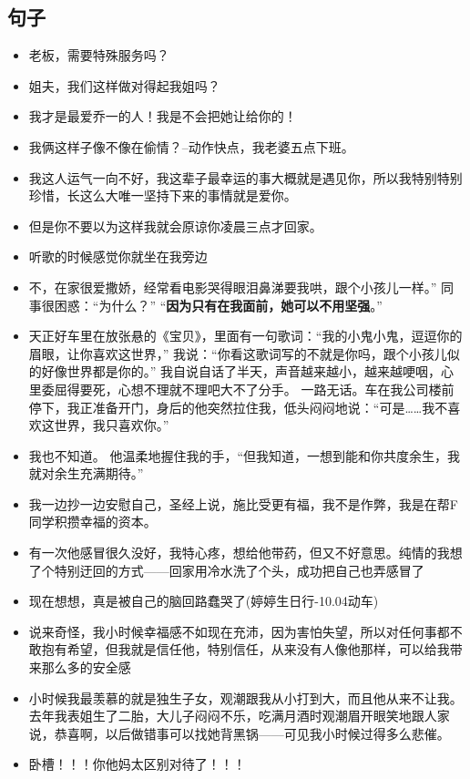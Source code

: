 \documentclass[UTF8,a4paper,8pt]{ctexbook}
\begin{document}
	\subsection*{句子}
		\begin{itemize}
			\item 老板，需要特殊服务吗？
			\item 姐夫，我们这样做对得起我姐吗？
			\item 我才是最爱乔一的人！我是不会把她让给你的！
			\item 我俩这样子像不像在偷情？--动作快点，我老婆五点下班。
			\item 我这人运气一向不好，我这辈子最幸运的事大概就是遇见你，所以我特别特别珍惜，长这么大唯一坚持下来的事情就是爱你。
			\item 但是你不要以为这样我就会原谅你凌晨三点才回家。
			\item 听歌的时候感觉你就坐在我旁边
			\item 不，在家很爱撒娇，经常看电影哭得眼泪鼻涕要我哄，跟个小孩儿一样。” 同事很困惑：“为什么？” “\textbf{因为只有在我面前，她可以不用坚强}。”
			\item 天正好车里在放张悬的《宝贝》，里面有一句歌词：“我的小鬼小鬼，逗逗你的眉眼，让你喜欢这世界，” 我说：“你看这歌词写的不就是你吗，跟个小孩儿似的好像世界都是你的。” 我自说自话了半天，声音越来越小，越来越哽咽，心里委屈得要死，心想不理就不理吧大不了分手。 一路无话。车在我公司楼前停下，我正准备开门，身后的他突然拉住我，低头闷闷地说：“可是……我不喜欢这世界，我只喜欢你。”
			\item 我也不知道。 他温柔地握住我的手，“但我知道，一想到能和你共度余生，我就对余生充满期待。”
			\item 我一边抄一边安慰自己，圣经上说，施比受更有福，我不是作弊，我是在帮F同学积攒幸福的资本。
			\item 有一次他感冒很久没好，我特心疼，想给他带药，但又不好意思。纯情的我想了个特别迂回的方式——回家用冷水洗了个头，成功把自己也弄感冒了
			\item 现在想想，真是被自己的脑回路蠢哭了(婷婷生日行-10.04动车)
			\item 说来奇怪，我小时候幸福感不如现在充沛，因为害怕失望，所以对任何事都不敢抱有希望，但我就是信任他，特别信任，从来没有人像他那样，可以给我带来那么多的安全感
			\item 小时候我最羡慕的就是独生子女，观潮跟我从小打到大，而且他从来不让我。去年我表姐生了二胎，大儿子闷闷不乐，吃满月酒时观潮眉开眼笑地跟人家说，恭喜啊，以后做错事可以找她背黑锅——可见我小时候过得多么悲催。
			\item 卧槽！！！你他妈太区别对待了！！！

\end{itemize}
\end{document}
